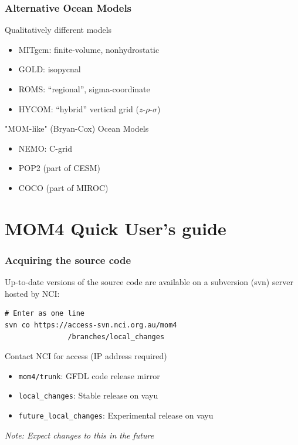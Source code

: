 \documentclass[red]{beamer}
\begin{document}
\begin{frame}
    \frametitle{Alternative Ocean Models}
    
    Qualitatively different models
    \begin{itemize}
        \item MITgcm: finite-volume, nonhydrostatic
        \item GOLD: isopycnal
        \item ROMS: ``regional'', sigma-coordinate
        \item HYCOM: ``hybrid'' vertical grid ($z$-$\rho$-$\sigma$)
    \end{itemize}
    
    "MOM-like" (Bryan-Cox) Ocean Models
    \begin{itemize}
        \item NEMO: C-grid
        \item POP2 (part of CESM)
        \item COCO (part of MIROC)
    \end{itemize}
\end{frame}

\section{MOM4 Quick User's guide}
\begin{frame}[fragile]
    \frametitle{Acquiring the source code}
    
    Up-to-date versions of the source code are available on a subversion (svn)
    server hosted by NCI:
    
    \begin{lstlisting}
# Enter as one line
svn co https://access-svn.nci.org.au/mom4
               /branches/local_changes
    \end{lstlisting}
    Contact NCI for access (IP address required)
    
    \begin{itemize}
        \item \lstinline|mom4/trunk|: GFDL code release mirror
        \item \lstinline|local_changes|: Stable release on vayu
        \item \lstinline|future_local_changes|: Experimental release on vayu
    \end{itemize}
    
    \textit{Note: Expect changes to this in the future}
\end{frame}
\end{document}
